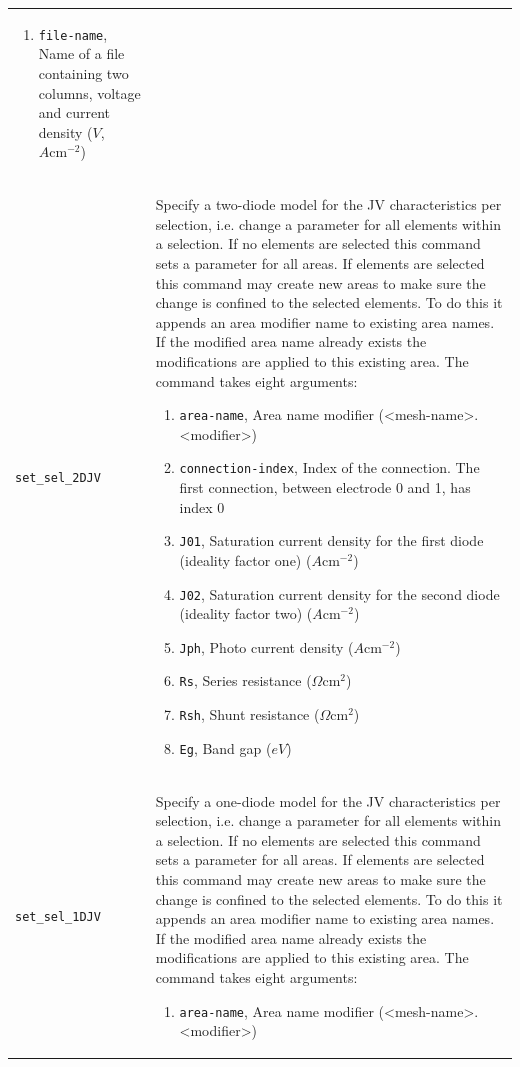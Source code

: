 \documentclass[noshowpacs,preprintnumbers,amsmath,amssymb, letter]{revtex4}
\begin{document}
\begin{longtable}{p{}p{}}
\begin{enumerate}
\item \texttt{file-name}, Name of a file containing two columns, voltage and current density ($V$, $A \text{cm}^{-2}$)
\end{enumerate}\\
\texttt{set\_sel\_2DJV}	&  Specify a two-diode model for the JV characteristics per selection, i.e. change a parameter for all elements within a selection. If no elements are selected this command sets a parameter for all areas. If elements are selected this command may create new areas to make sure the change is confined to the selected elements. To do this it appends an area modifier name to existing area names. If the modified area name already exists the modifications are applied to this existing area. The command takes eight arguments:
\begin{enumerate}
\item \texttt{area-name}, Area name modifier (\textless mesh-name\textgreater .\textless modifier\textgreater )
\item \texttt{connection-index}, Index of the connection. The first connection, between electrode 0 and 1,  has index 0
\item \texttt{J01}, Saturation current density for the first diode (ideality factor one)  ($A \text{cm}^{-2}$)
\item \texttt{J02}, Saturation current density for the second diode (ideality factor two)  ($A \text{cm}^{-2}$)
\item \texttt{Jph}, Photo current density ($A \text{cm}^{-2}$)
\item \texttt{Rs}, Series resistance ($\Omega \text{cm}^2$)
\item \texttt{Rsh}, Shunt resistance ($\Omega \text{cm}^2$)
\item \texttt{Eg}, Band gap ($eV$)
\end{enumerate}\\
\texttt{set\_sel\_1DJV}	&  Specify a one-diode model for the JV characteristics per selection, i.e. change a parameter for all elements within a selection. If no elements are selected this command sets a parameter for all areas. If elements are selected this command may create new areas to make sure the change is confined to the selected elements. To do this it appends an area modifier name to existing area names. If the modified area name already exists the modifications are applied to this existing area. The command takes eight arguments:
\begin{enumerate}
\item \texttt{area-name}, Area name modifier (\textless mesh-name\textgreater .\textless modifier\textgreater )

\end{enumerate}
\end{longtable}
\end{document}
